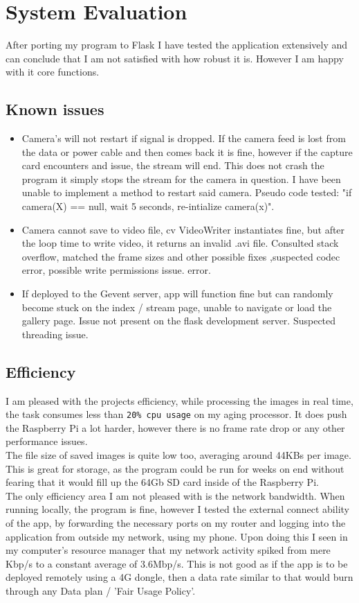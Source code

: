 \chapter{System Evaluation}
After porting my program to Flask I have tested the application extensively and can conclude that I am not satisfied with how robust it is. However I am happy with it core functions.
\section{Known issues}
\begin{itemize}
\item Camera's will not restart if signal is dropped. If the camera feed is lost from the data or power cable and then comes back it is fine, however if the capture card encounters and issue, the stream will end. This does not crash the program it simply stops the stream for the camera in question. I have been unable to implement a method to restart said camera. Pseudo code tested: "if camera(X) == null, wait 5 seconds, re-intialize camera(x)".
\item Camera cannot save to video file, cv VideoWriter instantiates fine, but after the loop time to write video, it returns an invalid .avi file. Consulted stack overflow, matched the frame sizes and other possible fixes ,suspected codec error, possible write permissions issue. error\cite{stackOverflow}\cite{stackOverflow2}.
\item If deployed to the Gevent server, app will function fine but can randomly become stuck on the index / stream page, unable to navigate or load the gallery page. Issue not present on the flask development server. Suspected threading issue.
\end{itemize}

\section{Efficiency}
I am pleased with the projects efficiency, while processing the images in real time, the task consumes less than \verb|20% cpu usage| on my aging processor. It does push the Raspberry Pi a lot harder, however there is no frame rate drop or any other performance issues. \\ The file size of saved images is quite low too, averaging around 44KBs per image. This is great for storage, as the program could be run for weeks on end without fearing that it would fill up the 64Gb SD card inside of the Raspberry Pi. \\ The only efficiency area I am not pleased with is the network bandwidth. When running locally, the program is fine, however I tested the external connect ability of the app, by forwarding the necessary ports on my router and logging into the application from outside my network, using my phone. Upon doing this I seen in my computer's resource manager that my network activity spiked from mere Kbp/s to a constant average of 3.6Mbp/s. This is not good as if the app is to be deployed remotely using a 4G dongle, then a data rate similar to that would burn through any Data plan / 'Fair Usage Policy'.

